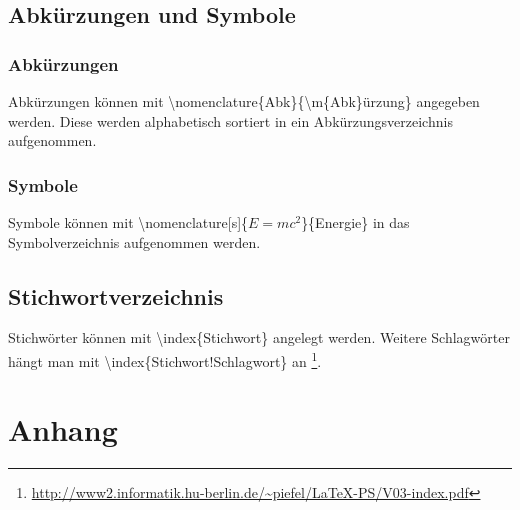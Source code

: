 \section{Abkürzungen und Symbole}
\subsection{Abkürzungen}
Abkürzungen können mit \textbackslash nomenclature\{Abk\}\{\textbackslash m\{Abk\}ürzung\}  angegeben werden. Diese werden alphabetisch sortiert in ein Abkürzungsverzeichnis aufgenommen.
\subsection{Symbole}
Symbole können mit \textbackslash nomenclature[s]\{$E=mc^2$\}\{Energie\}
 in das Symbolverzeichnis aufgenommen werden.
\section{Stichwortverzeichnis}
Stichwörter können mit \textbackslash index\{Stichwort\} angelegt werden. Weitere Schlagwörter hängt man mit \textbackslash index\{Stichwort!Schlagwort\} an \footnote{\url{http://www2.informatik.hu-berlin.de/~piefel/LaTeX-PS/V03-index.pdf}}.

\cleardoubleemptypage 
\pagestyle{scrplain}


\cleardoubleemptypage%
%
%
\printindex%


\appendix
{}
\chapter{Anhang}

\cleardoubleemptypage 
\erklaerung

